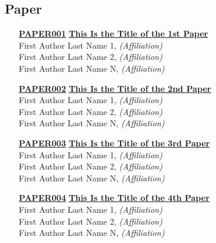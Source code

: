 
\subsection{Paper}
\begin{enumerate}
\item[\href{https://doi.org/10.1145/1122445.1122456}{\textbf{PAPER001}}]
\href{https://doi.org/10.1145/1122445.1122456}{\textbf{This Is the Title of the 1st Paper}}\\
First Author Last Name 1, \emph{(Affiliation)}\\
First Author Last Name 2, \emph{(Affiliation)}\\
First Author Last Name N, \emph{(Affiliation)}\\

\item[\href{https://doi.org/10.1145/1122445.1122456}{\textbf{PAPER002}}]
\href{https://doi.org/10.1145/1122445.1122456}{\textbf{This Is the Title of the 2nd Paper}}\\
First Author Last Name 1, \emph{(Affiliation)}\\
First Author Last Name 2, \emph{(Affiliation)}\\
First Author Last Name N, \emph{(Affiliation)}\\

\item[\href{https://doi.org/10.1145/1122445.1122456}{\textbf{PAPER003}}]
\href{https://doi.org/10.1145/1122445.1122456}{\textbf{This Is the Title of the 3rd Paper}}\\
First Author Last Name 1, \emph{(Affiliation)}\\
First Author Last Name 2, \emph{(Affiliation)}\\
First Author Last Name N, \emph{(Affiliation)}\\

\item[\href{https://doi.org/10.1145/1122445.1122456}{\textbf{PAPER004}}]
\href{https://doi.org/10.1145/1122445.1122456}{\textbf{This Is the Title of the 4th Paper}}\\
First Author Last Name 1, \emph{(Affiliation)}\\
First Author Last Name 2, \emph{(Affiliation)}\\
First Author Last Name N, \emph{(Affiliation)}\\
\end{enumerate}


